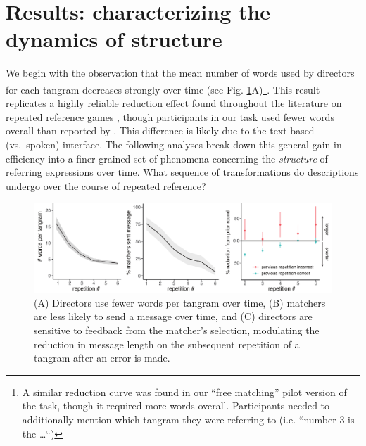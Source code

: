 \documentclass[alpha-refs]{wiley-article}
\begin{document}

\section{Results: characterizing the dynamics of structure}
\label{sec:structure}

We begin with the observation that the mean number of words used by directors for each tangram decreases strongly over time (see Fig. \ref{fig:feedback}A)\footnote{A similar reduction curve was found in our  ``free matching'' pilot version of the task, though it required more words overall. Participants needed to additionally mention which tangram they were referring to (i.e. ``number 3 is the \dots``)}.
This result replicates a highly reliable reduction effect found throughout the literature on repeated reference games \citep[e.g.][]{KraussWeinheimer64_ReferencePhrases,BrennanClark96_ConceptualPactsConversation}, though participants in our task used fewer words overall than reported by \cite{ClarkWilkesGibbs86_ReferringCollaborative}. 
This difference is likely due to the text-based (vs.~spoken) interface.
The following analyses break down this general gain in efficiency into a finer-grained set of phenomena concerning the \emph{structure} of referring expressions over time.
What sequence of transformations do descriptions undergo over the course of repeated reference?


\begin{figure}[t]
\centering
\includegraphics[scale=.64]{listenerFeedback_combined.pdf}
\caption{(A) Directors use fewer words per tangram over time, (B) matchers are less likely to send a message over time, and (C) directors are sensitive to feedback from the matcher's selection, modulating the reduction in message length on the subsequent repetition of a tangram after an error is made.}
\label{fig:feedback}
\end{figure}
\end{document}

